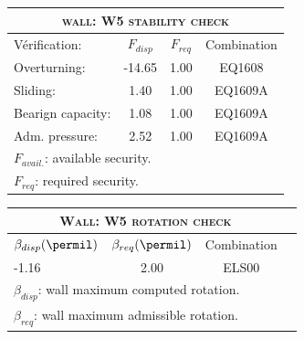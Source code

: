 \begin{center}
\begin{tabular}[H]{|l|c|c|c|}
\hline
\multicolumn{4}{|c|}{\textsc{wall: W5 stability check}}\\
\hline
Vérification:  & $F_{disp}$ & $F_{req}$ & Combination\\
\hline
Overturning:  & -14.65 & 1.00 & EQ1608\\
Sliding:  & 1.40 & 1.00 & EQ1609A\\
Bearign capacity:  & 1.08 & 1.00 & EQ1609A\\
Adm. pressure:  & 2.52 & 1.00 & EQ1609A\\
\hline
\multicolumn{4}{|l|}{$F_{avail.}$: available security.}\\
\multicolumn{4}{|l|}{$F_{req}$: required security.}\\
\hline
\end{tabular}
\end{center}
\begin{center}
\begin{tabular}[H]{|l|c|c|c|}
\hline
\multicolumn{3}{|c|}{\textsc{Wall: W5 rotation check}}\\
\hline
$\beta_{disp} (\permil)$ & $\beta_{req}(\permil)$ & Combination\\
\hline
-1.16 & 2.00 & ELS00\\
\hline
\multicolumn{3}{|l|}{$\beta_{disp}$: wall maximum computed rotation.}\\
\multicolumn{3}{|l|}{$\beta_{req}$: wall maximum admissible rotation.}\\
\hline
\end{tabular}
\end{center}
 \label{tb_W5}
\tablelasttail{\hline}
